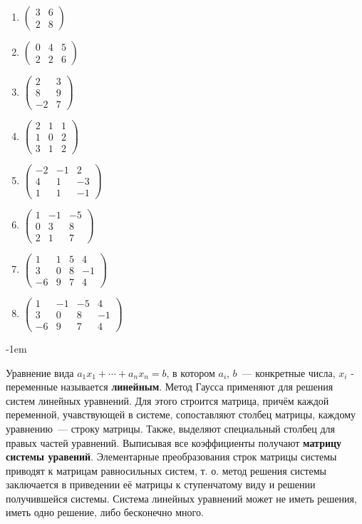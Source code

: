 \documentclass[a4paper,10pt]{article}
\begin{document}
{\begin{multicols}{4}
	\begin{enumerate}[label=(\arabic*)\,]
		\item 
$\begin{pmatrix}
    3 & 6 \\
    2 & 8
\end{pmatrix}$
		\item 
$\begin{pmatrix}
    0 & 4 & 5 \\
    2 & 2 & 6
\end{pmatrix}$
		\item 
$\begin{pmatrix}
    2 & 3 \\
    8 & 9 \\
   -2 & 7
\end{pmatrix}$
		\item 
$\begin{pmatrix}
    2 & 1 & 1 \\
    1 & 0 & 2 \\
    3 & 1 & 2
\end{pmatrix}$
		\item 
$\begin{pmatrix}
    -2 & -1 & 2 \\
    4 & 1 & -3 \\
    1 & 1 & -1
\end{pmatrix}$
		\item 
$\begin{pmatrix}
    1 & -1 & -5 \\
    0 & 3 & 8 \\
    2 & 1 & 7
\end{pmatrix}$
		\item 
$\begin{pmatrix}
    1 & 1 & 5 & 4 \\
    3 & 0 & 8 & -1 \\
    -6 & 9 & 7 & 4
\end{pmatrix}$
		\item 
$\begin{pmatrix}
    1 & -1 & -5 & 4 \\
    3 & 0 & 8 & -1 \\
    -6 & 9 & 7 & 4
\end{pmatrix}$
	\end{enumerate}
\end{multicols}\par\kern-1em

Уравнение вида $a_1x_1+\cdots+a_nx_n=b$, в котором $a_i$, $b$~--- конкретные числа, $x_i$ - переменные называется \textbf{линейным}. Метод Гаусса применяют для решения систем линейных уравнений. Для этого строится матрица, причём каждой переменной, учавствующей в системе, сопоставляют столбец матрицы, каждому уравнению~--- строку матрицы. Также, выделяют специальный столбец для правых частей уравнений. Выписывая все коэффициенты получают \textbf{матрицу системы уравений}. Элементарные преобразования строк матрицы системы приводят к матрицам равносильных систем, т. о. метод решения системы заключается в приведении её матрицы к ступенчатому виду и решении получившейся системы. Система линейных уравнений может не иметь решения, иметь одно решение, либо бесконечно много.

}
\end{document}
